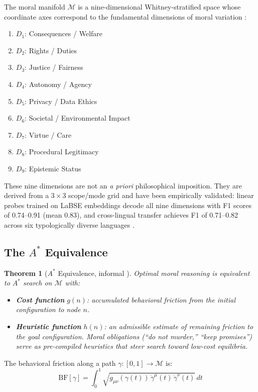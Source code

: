 \documentclass[12pt,letterpaper]{article}
\newtheorem{theorem}{Theorem}[section]
\theoremstyle{definition}
\newcommand{\calM}{\mathcal{M}}
\newcommand{\BF}{\mathrm{BF}}
\begin{document}
The moral manifold $\calM$ is a nine-dimensional Whitney-stratified space whose coordinate axes correspond to the fundamental dimensions of moral variation \cite{bond2026ge}:

\begin{enumerate}
    \item $D_1$: Consequences / Welfare
    \item $D_2$: Rights / Duties
    \item $D_3$: Justice / Fairness
    \item $D_4$: Autonomy / Agency
    \item $D_5$: Privacy / Data Ethics
    \item $D_6$: Societal / Environmental Impact
    \item $D_7$: Virtue / Care
    \item $D_8$: Procedural Legitimacy
    \item $D_9$: Epistemic Status
\end{enumerate}

These nine dimensions are not an \emph{a priori} philosophical imposition. They are derived from a $3 \times 3$ scope/mode grid and have been empirically validated: linear probes trained on LaBSE embeddings decode all nine dimensions with F1 scores of 0.74--0.91 (mean 0.83), and cross-lingual transfer achieves F1 of 0.71--0.82 across six typologically diverse languages \cite{thiele2026}.

\subsection{The $A^*$ Equivalence}

\begin{theorem}[$A^*$ Equivalence, informal {\cite[KA-7]{bond2026pe}}]
Optimal moral reasoning is equivalent to $A^*$ search on $\calM$ with:
\begin{itemize}
    \item \textbf{Cost function} $g(n)$: accumulated behavioral friction from the initial configuration to node $n$.
    \item \textbf{Heuristic function} $h(n)$: an admissible estimate of remaining friction to the goal configuration. Moral obligations (``do not murder,'' ``keep promises'') serve as pre-compiled heuristics that steer search toward low-cost equilibria.
\end{itemize}
\end{theorem}

The behavioral friction along a path $\gamma: [0,1] \to \calM$ is:
\begin{equation}\label{eq:bf}
\BF[\gamma] = \int_0^1 \sqrt{g_{\mu\nu}(\gamma(t))\, \dot{\gamma}^\mu(t)\, \dot{\gamma}^\nu(t)}\, dt
\end{equation}
\end{document}
